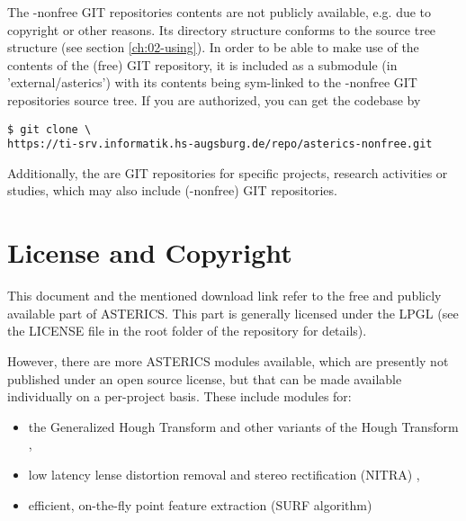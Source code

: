 \ifdefined\astericsinternal
\noindent The \asterics-nonfree GIT repositories contents are not publicly available, e.g. due to copyright or other reasons. 
Its directory structure conforms to the source tree structure (see section \ref{ch:02-using}). 
In order to be able to make use of the contents of the (free) \asterics GIT repository, it is included as a submodule (in 'external/asterics') with its contents being sym-linked to the \asterics-nonfree GIT repositories source tree. 
If you are authorized, you can get the codebase by 

\begin{footnotesize}
    \begin{lstlisting}[style=shell]
$ git clone \
https://ti-srv.informatik.hs-augsburg.de/repo/asterics-nonfree.git
    \end{lstlisting}
\end{footnotesize}

\noindent Additionally, the are GIT repositories for specific projects, research activities or studies, which may also include \asterics(-nonfree) GIT repositories.
\fi

\section{License and Copyright}


This document and the mentioned download link refer to the free and publicly available part of ASTERICS. This part is generally licensed under the LPGL (see the LICENSE file in the root folder of the repository for details).

However, there are more ASTERICS modules available, which are presently not published under an open source license, but that can be made available individually on a per-project basis. These include modules for:
\begin{itemize}

\item the Generalized Hough Transform and other variants of the Hough Transform \cite{kiefer_configurable_2016}, \cite{hough_object_recog}

\item low latency lense distortion removal and stereo rectification (NITRA) \cite{nitra_paper0}, \cite{nitra_paper1}

\item efficient, on-the-fly point feature extraction (SURF algorithm) \cite{pohl_efficient_2014}
\end{itemize}

